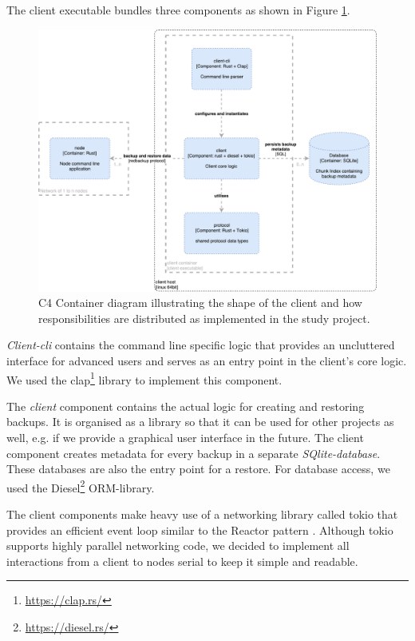 The \gls{client} executable bundles three components as shown in Figure \ref{fig:c4-client-container}.

\begin{figure}[h]
	\centering
	\includegraphics[width=1\linewidth]{resources/c4-client-container}
	\caption[Client specific C4 Container diagram]{C4 Container diagram illustrating the shape of the \gls{client} and how responsibilities are distributed as implemented in the study project.}
	\label{fig:c4-client-container}
\end{figure}

\emph{Client-cli} contains the command line specific logic that provides an uncluttered interface for advanced users and serves as an entry point in the client's core logic. We used the clap\footnote{\url{https://clap.rs/}}  library to implement this component.

The \emph{client} component contains the actual logic for creating and restoring backups. It is organised as a library so that it can be used for other projects as well, e.g. if we provide a graphical user interface in the future. The \gls{client} component creates metadata for every backup in a separate \emph{SQlite-database}. These databases are also the entry point for a restore. For database access, we used the Diesel\footnote{\url{https://diesel.rs/}} ORM-library.

The \gls{client} components make heavy use of a networking library called tokio\cite{tokio-rs} that provides an efficient event loop similar to the Reactor pattern \cite{POSA1}. Although tokio supports highly parallel networking code, we decided to implement all interactions from a \gls{client} to \glspl{node} serial to keep it simple and readable.

